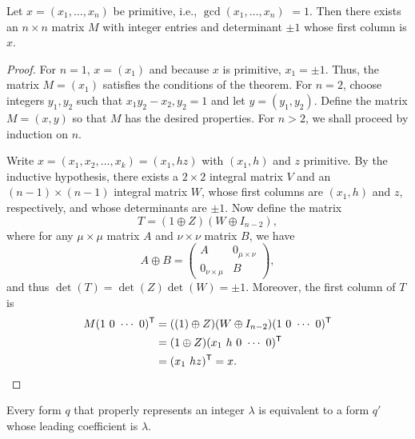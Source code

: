 \begin{theorem}{\normalfont\cite[p.~6]{watson1960integral}} Let \(x = (x_1,
    \dots, x_n)\) be primitive, i.e., \(\gcd(x_1, \dots, x_n)\) \(= 1\). Then
    there exists an \(n \times n\) matrix \(M\) with integer entries and
    determinant \(\pm 1\) whose first column is \(x\).
\end{theorem}

\begin{proof}
    For \(n = 1\), \(x = (x_1)\) and because \(x\) is primitive, \(x_1 = \pm
    1\). Thus, the matrix \(M = (x_1)\) satisfies the conditions of the theorem.
    For \(n = 2\), choose integers \(y_1, y_2\) such that \(x_1y_2 - x_2, y_2 =
    1\) and let \(y = (y_1, y_2)\). Define the matrix \(M = (x, y)\) so that
    \(M\) has the desired properties. For \(n > 2\), we shall proceed by
    induction on \(n\).
    
    Write \(x = (x_1, x_2, \dots, x_k) = (x_1, hz)\) with \((x_1, h)\) and \(z\)
    primitive. By the inductive hypothesis, there exists a \(2 \times 2\)
    integral matrix \(V\) and an \((n - 1) \times (n - 1)\) integral matrix
    \(W\), whose first columns are \((x_1, h)\) and \(z\), respectively, and
    whose determinants are \(\pm 1\). Now define the matrix
    \[
      T = (1 \oplus Z)(W \oplus I_{n - 2}),
    \]
    where for any \(\mu \times \mu\) matrix \(A\) and \(\nu \times \nu\) matrix
    \(B\), we have
    \[
      A \oplus B = \begin{pmatrix}
        A & 0_{\mu \times \nu} \\
        0_{\nu \times \mu} & B
      \end{pmatrix},
    \]
    and thus \(\det(T) = \det(Z)\det(W) = \pm 1\). Moreover, the first column of
    \(T\) is
    \begin{align*}
      M(1\ 0\ \cdots\ 0)^{\mathsf{T}} &= ((1) \oplus Z)(W \oplus I_{n - 2})(1\ 0\ \cdots\ 0)^{\mathsf{T}}\\
      &= (1 \oplus Z)(x_1\ h\ 0\ \cdots\ 0)^{\mathsf{T}}\\
      &= (x_1\ hz)^{\mathsf{T}} = x.\qedhere
    \end{align*}
\end{proof}

\begin{corollary}{\normalfont\cite[p.~6]{watson1960integral}}
  \label{cor:leading-coefficient}
    Every form \(q\) that properly represents an integer \(\lambda\) is
    equivalent to a form \(q'\) whose leading coefficient is \(\lambda\).
\end{corollary}

